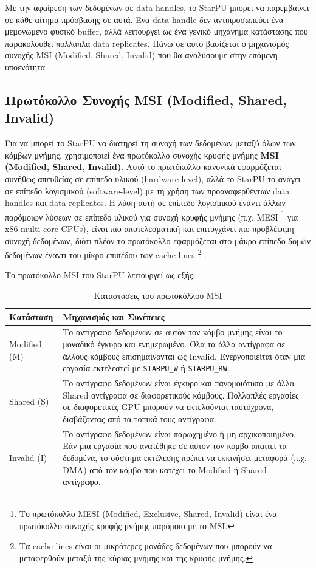 Με την αφαίρεση των δεδομένων σε data handles, το StarPU μπορεί να παρεμβαίνει σε κάθε αίτημα πρόσβασης σε αυτά. Ένα data handle δεν αντιπροσωπεύει ένα μεμονωμένο φυσικό buffer, αλλά λειτουργεί ως ένα γενικό μηχάνημα κατάστασης που παρακολουθεί πολλαπλά data replicates. Πάνω σε αυτό βασίζεται ο μηχανισμός συνοχής MSI (Modified, Shared, Invalid) που θα αναλύσουμε στην επόμενη υποενότητα \cite{starpu2025handbook, starpu_dev_manual}.

\subsection{Πρωτόκολλο Συνοχής MSI (Modified, Shared, Invalid)}

Για να μπορεί το StarPU να διατηρεί τη συνοχή των δεδομένων μεταξύ όλων των κόμβων μνήμης, χρησιμοποιεί ένα πρωτόκολλο συνοχής κρυφής μνήμης \textbf{MSI (Modified, Shared, Invalid)}. Αυτό το πρωτόκολλο κανονικά εφαρμόζεται συνήθως απευθείας σε επίπεδο υλικού (hardware-level), αλλά το StarPU το ανάγει σε επίπεδο λογισμικού (software-level) με τη χρήση των προαναφερθέντων data handles και data replicates. Η λύση αυτή σε επίπεδο λογισμικού έναντι άλλων παρόμοιων λύσεων σε επίπεδο υλικού για συνοχή κρυφής μνήμης (π.χ. MESI \footnote{Το πρωτόκολλο MESI (Modified, Exclusive, Shared, Invalid) είναι ένα πρωτόκολλο συνοχής κρυφής μνήμης παρόμοιο με το MSI.} για x86 multi-core CPUs), είναι πιο αποτελεσματική και επιτυγχάνει πιο προβλέψιμη συνοχή δεδομένων, διότι πλέον το πρωτόκολλο εφαρμόζεται στο μάκρο-επίπεδο δομών δεδομένων έναντι του μίκρο-επιπέδου των cache-lines \footnote{Τα cache lines είναι οι μικρότερες μονάδες δεδομένων που μπορούν να μεταφερθούν μεταξύ της κύριας μνήμης και της κρυφής μνήμης.} \cite{aiken_cs315b_lec13, qin2012cachecoherence}.

Το πρωτόκολλο MSI του StarPU λειτουργεί ως εξής:

\begin{table}[H]
  \centering
  \begin{tabularx}{\textwidth}{|l|X|}
    \hline
    \textbf{Κατάσταση} & \textbf{Μηχανισμός και Συνέπειες} \\
    \hline
    Modified (M) &
    Το αντίγραφο δεδομένων σε αυτόν τον κόμβο μνήμης είναι το μοναδικό έγκυρο και ενημερωμένο. Όλα τα άλλα αντίγραφα σε άλλους κόμβους επισημαίνονται ως Invalid.
    Ενεργοποιείται όταν μια εργασία εκτελεστεί με \texttt{STARPU\_W} ή \texttt{STARPU\_RW}. \\
    \hline
    Shared (S) &
    Το αντίγραφο δεδομένων είναι έγκυρο και πανομοιότυπο με άλλα Shared αντίγραφα σε διαφορετικούς κόμβους. Πολλαπλές εργασίες σε διαφορετικές GPU μπορούν να εκτελούνται ταυτόχρονα, διαβάζοντας από τα τοπικά τους αντίγραφα. \\
    \hline
    Invalid (I) &
    Το αντίγραφο δεδομένων είναι παρωχημένο ή μη αρχικοποιημένο. Εάν μια εργασία που ανατέθηκε σε αυτόν τον κόμβο απαιτεί τα δεδομένα, το σύστημα εκτέλεσης πρέπει να εκκινήσει μεταφορά (π.χ. DMA) από τον κόμβο που κατέχει το Modified ή Shared αντίγραφο. \\
    \hline
  \end{tabularx}
  \caption{Καταστάσεις του πρωτοκόλλου MSI}
  \label{tab:starpu_msi_states}
\end{table}

